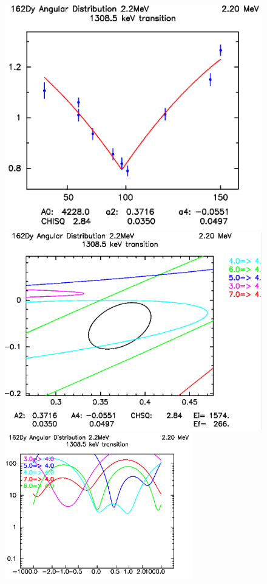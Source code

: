 \begin{figure}[ht]
\begin{center}
\includegraphics[height=0.25\textheight]{figures/1308_AD_fit.png}
\includegraphics[height=0.25\textheight]{figures/1308_AD_chisq_fit.png}\\
\includegraphics[width=0.73\textwidth]{figures/1308_AD_delta_chi.png}\\

\end{center}
\end{figure}

